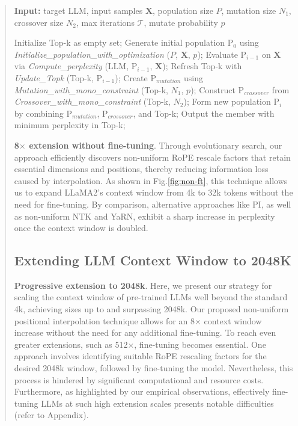 \begin{abstract}
\begin{algorithm}[t]
	\small
	\caption{The search algorithm}
	\textbf{Input:} target LLM, input samples $\mathbf{X}$, population size $P$, mutation size $N_1$, crossover size $N_2$, max iterations $\mathcal{T}$, mutate probability $p$\\

	\begin{algorithmic}[1]
		\label{alg:search}
		\STATE Initialize Top-k as empty set;
		\STATE Generate initial population $\text{P}_0$ using \textit{Initialize\_population\_with\_optimization} ($P$, $\mathbf{X}$, $p$); 
		\STATE Evaluate $\text{P}_{i-1}$ on $\mathbf{X}$ via \textit{Compute\_perplexity} (LLM, $\text{P}_{i-1}$, $\mathbf{X}$);
		\STATE  Refresh Top-k with \textit{Update\_Topk} (Top-k, $\text{P}_{i-1}$);
		\STATE Create $\text{P}_{mutation}$ using \textit{Mutation\_with\_mono\_constraint} (Top-k, $N_1$, $p$); 
		\STATE Construct $\text{P}_{crossover}$ from \textit{Crossover\_with\_mono\_constraint} (Top-k, $N_2$);
		\STATE Form new population $\text{P}_i$ by combining $\text{P}_{mutation}$, $\text{P}_{crossover}$, and Top-k;
		\ENDFOR
		\STATE Output the member with minimum perplexity in Top-k;
	\end{algorithmic}
\end{algorithm}

\textbf{8$\times$ extension without fine-tuning}. Through evolutionary search, our approach efficiently discovers non-uniform RoPE rescale factors that retain essential dimensions and positions, thereby reducing information loss caused by interpolation. As shown in Fig.\ref{fig:non-ft}, this technique allows us to expand LLaMA2’s context window from 4k to 32k tokens without the need for fine-tuning. By comparison, alternative approaches like PI, as well as non-uniform NTK and YaRN, exhibit a sharp increase in perplexity once the context window is doubled.

\subsection{Extending LLM Context Window to 2048K}
\label{sec:extendto2048k}

\textbf{Progressive extension to 2048k}. Here, we present our strategy for scaling the context window of pre-trained LLMs well beyond the standard 4k, achieving sizes up to and surpassing 2048k. Our proposed non-uniform positional interpolation technique allows for an 8$\times$ context window increase without the need for any additional fine-tuning. To reach even greater extensions, such as 512$\times$, fine-tuning becomes essential. One approach involves identifying suitable RoPE rescaling factors for the desired 2048k window, followed by fine-tuning the model. Nevertheless, this process is hindered by significant computational and resource costs. Furthermore, as highlighted by our empirical observations, effectively fine-tuning LLMs at such high extension scales presents notable difficulties (refer to Appendix).


\end{abstract}
